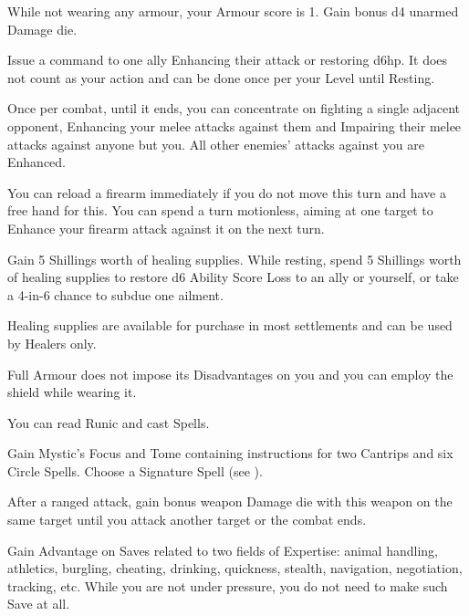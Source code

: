 \documentclass[itdr/core]{subfiles}
\begin{document}
\vfill
{}\featmt\feathp
While not wearing any armour, your Armour score is 1. Gain bonus d4 unarmed Damage die.

\vfill
{}
Issue a command to one ally Enhancing their attack or restoring d6hp. It does not count as your action and can be done once per your Level until Resting.

\break

\feathp
Once per combat, until it ends, you can concentrate on fighting a single adjacent opponent, Enhancing your melee attacks against them and Impairing their melee attacks against anyone but you. All other \mbox{enemies'} attacks against you are Enhanced.

\vfill
{}
You can reload a firearm immediately if you do not move this turn and have a free hand for this.
You can spend a turn motionless, aiming at one target to Enhance your firearm attack against it on the next turn.\tight

\vfill
{}
Gain 5 Shillings worth of healing supplies.
While resting, spend 5 Shillings worth of healing supplies to restore d6 Ability Score Loss to an ally or yourself, or take a 4-in-6 chance to subdue one ailment.

Healing supplies are available for purchase in most settlements and can be used by Healers only.

\vfill
{}
\feathp
Full Armour does not impose its Disadvantages on you and you can employ the shield while wearing it.

\vfill
{}
\featmt
You can read Runic and cast Spells.

Gain Mystic's Focus and Tome containing instructions for two Cantrips and six  Circle Spells. Choose a Signature Spell (see \textbf{}).

\vfill
{}
After a ranged attack, gain bonus weapon Damage die with this weapon on the same target until you attack another target or the combat ends.

\vfill
{}
\featmt
Gain Advantage on Saves related to two fields of \mbox{Expertise:} animal handling, athletics, burgling, cheating, drinking, quickness, stealth, navigation, negotiation, tracking, etc. While you are not under pressure, you do not need to make such Save at all.
\end{document}
